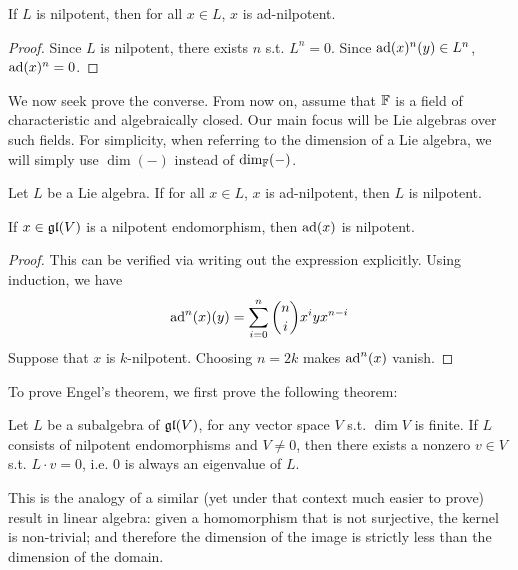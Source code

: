 \documentclass{article}
\begin{document}
\begin{lemma}\label{lem: nilpotent algebra implies every element is ad-nilpotent}
    If $L$ is nilpotent, then for all $x \in L$, $x$ is ad-nilpotent.
\end{lemma}

\begin{proof}
    Since $L$ is nilpotent, there exists $n$ s.t. $L^n = 0$. Since $\operatorname{ad}(x)^n (y) \in L^n$, $\operatorname{ad}(x)^n = 0$.
\end{proof}

\textstart
We now seek prove the converse. From now on, assume that $\mathbb{F}$ is a field of characteristic and algebraically closed. Our main focus will be Lie algebras over such fields. For simplicity, when referring to the dimension of a Lie algebra, we will simply use $\dim (-)$ instead of $\dim_{\mathbb{F}} (-)$.

\begin{theorem}[Engel]\label{thm: Engel}
    Let $L$ be a Lie algebra. If for all $x \in L$, $x$ is ad-nilpotent, then $L$ is nilpotent.
\end{theorem}

\begin{lemma}\label{lem: nilpotent implies ad-nilpotent}
    If $x \in \mathfrak{gl}(V)$ is a nilpotent endomorphism, then $\operatorname{ad}(x)$ is nilpotent.
\end{lemma}

\begin{proof}
    This can be verified via writing out the expression explicitly. Using induction, we have
    \[
        \operatorname{ad}^n(x) (y) = \sum_{i = 0}^n \binom{n}{i} x^i y x^{n-i}
    \]
    Suppose that $x$ is $k$-nilpotent. Choosing $n = 2k$ makes $\operatorname{ad}^n(x)$ vanish.
\end{proof}

To prove Engel's theorem, we first prove the following theorem:

\begin{theorem}\label{thm: 0 is eigenvalue of lie algebra of nilpotent endomorphisms}
    Let $L$ be a subalgebra of $\mathfrak{gl}(V)$, for any vector space $V$ s.t. $\dim V$ is finite. If $L$ consists of nilpotent endomorphisms and $V \neq 0$, then there exists a nonzero $v \in V$ s.t. $L \cdot v = 0$, i.e. 0 is always an eigenvalue of $L$.
\end{theorem}
\nogap
\begin{remark}
    This is the analogy of a similar (yet under that context much easier to prove) result in linear algebra: given a homomorphism that is not surjective, the kernel is non-trivial; and therefore the dimension of the image is strictly less than the dimension of the domain.
\end{remark}
\end{document}
